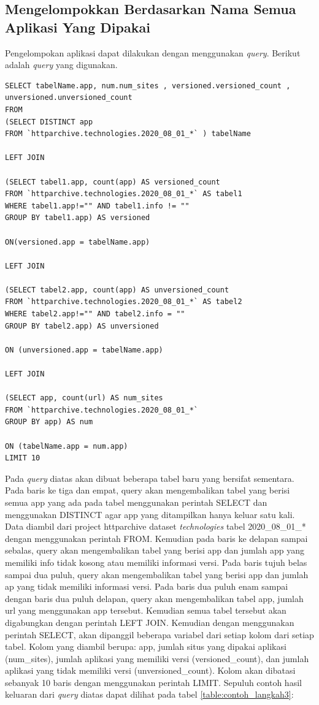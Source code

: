 \subsection{Mengelompokkan Berdasarkan Nama Semua Aplikasi Yang Dipakai}
Pengelompokan aplikasi dapat dilakukan dengan menggunakan \textit{query}. Berikut adalah \textit{query} yang digunakan.
\begin{lstlisting}
SELECT tabelName.app, num.num_sites , versioned.versioned_count , unversioned.unversioned_count
FROM 
(SELECT DISTINCT app
FROM `httparchive.technologies.2020_08_01_*` ) tabelName

LEFT JOIN 

(SELECT tabel1.app, count(app) AS versioned_count
FROM `httparchive.technologies.2020_08_01_*` AS tabel1
WHERE tabel1.app!="" AND tabel1.info != "" 
GROUP BY tabel1.app) AS versioned

ON(versioned.app = tabelName.app)

LEFT JOIN

(SELECT tabel2.app, count(app) AS unversioned_count
FROM `httparchive.technologies.2020_08_01_*` AS tabel2
WHERE tabel2.app!="" AND tabel2.info = "" 
GROUP BY tabel2.app) AS unversioned

ON (unversioned.app = tabelName.app)

LEFT JOIN 

(SELECT app, count(url) AS num_sites
FROM `httparchive.technologies.2020_08_01_*`
GROUP BY app) AS num

ON (tabelName.app = num.app)
LIMIT 10
\end{lstlisting}

Pada \textit{query} diatas akan dibuat beberapa tabel baru yang bersifat sementara. Pada baris ke tiga dan empat, query akan mengembalikan tabel yang berisi semua app yang ada pada tabel menggunakan perintah SELECT dan menggunakan DISTINCT agar app yang ditampilkan hanya keluar satu kali. Data diambil dari project httparchive dataset \textit{technologies} tabel 2020\_08\_01\_* dengan menggunakan perintah FROM. Kemudian pada baris ke delapan sampai sebalas, query akan mengembalikan tabel yang berisi app dan jumlah app yang memiliki info tidak kosong atau memiliki informasi versi. Pada baris tujuh belas sampai dua puluh, query akan mengembalikan tabel yang berisi app dan jumlah ap yang tidak memiliki informasi versi. Pada baris dua puluh enam sampai dengan baris dua puluh delapan, query akan mengembalikan tabel app, jumlah url yang menggunakan app tersebut. Kemudian semua tabel tersebut akan digabungkan dengan perintah LEFT JOIN. Kemudian dengan menggunakan perintah SELECT, akan dipanggil beberapa variabel dari setiap kolom dari setiap tabel. Kolom yang diambil berupa: app, jumlah situs yang dipakai aplikasi (num\_sites), jumlah aplikasi yang memiliki versi (versioned\_count), dan jumlah aplikasi yang tidak memiliki versi (unversioned\_count). Kolom akan dibatasi sebanyak 10 baris dengan menggunakan perintah LIMIT. Sepuluh contoh hasil keluaran dari \textit{query} diatas dapat dilihat pada tabel \ref{table:contoh_langkah3}:

